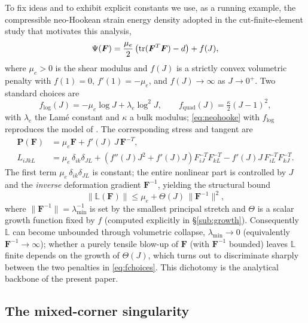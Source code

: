 To fix ideas and to exhibit explicit constants we use, as a running example, the compressible neo-Hookean strain energy
density adopted in the cut-finite-element study \cite{cutfemAD} that motivates this analysis,
\begin{equation}
    \label{eq:neohooke}
    \Psi(\bm{F}) = \frac{\mu_e}{2}\left( \operatorname{tr}(\bm{F}^T \bm{F}) - d \right) + f(J),
\end{equation}
where $\mu_e > 0$ is the shear modulus and $f(J)$ is a strictly convex volumetric penalty with $f(1) = 0$,
$f'(1) = -\mu_e$, and $f(J) \to \infty$ as $J \to 0^+$. Two standard choices are
\begin{equation}
    \label{eq:fchoices}
    f_{\log}(J) = -\mu_e \log J + \lambda_e \log^2 J,
    \qquad
    f_{\mathrm{quad}}(J) = \tfrac{\kappa}{2}(J-1)^2,
\end{equation}
with $\lambda_e$ the Lam\'e constant and $\kappa$ a bulk modulus; \eqref{eq:neohooke} with $f_{\log}$ reproduces the
model of \cite{cutfemAD}. The corresponding stress and tangent are
\begin{align}
    \bm{P}(\bm{F}) & = \mu_e \bm{F} + f'(J)\,J\,\bm{F}^{-T}, \\
    \label{eq:Lnh}
    L_{iJkL}       & = \mu_e\,\delta_{ik}\delta_{JL}
    + \left( f''(J)J^2 + f'(J)J \right) F^{-T}_{iJ} F^{-T}_{kL}
    - f'(J)J\, F^{-T}_{iL} F^{-T}_{kJ}.
\end{align}
The first term $\mu_e\,\delta_{ik}\delta_{JL}$ is constant; the entire nonlinear part is controlled by $J$ and the
\emph{inverse} deformation gradient $\bm{F}^{-1}$, yielding the structural bound
\begin{equation}
    \label{eq:Lbound}
    \| \mathbb{L}(\bm{F}) \| \le \mu_e + \Theta(J)\,\| \bm{F}^{-1} \|^2,
\end{equation}
where $\|\bm{F}^{-1}\| = \lambda_{\min}^{-1}$ is set by the smallest principal stretch and $\Theta$ is a scalar growth
function fixed by $f$ (computed explicitly in \S\ref{sub:growth}). Consequently $\mathbb{L}$ can become unbounded
through volumetric collapse, $\lambda_{\min} \to 0$ (equivalently $\bm{F}^{-1} \to \infty$); whether a purely tensile
blow-up of $\bm{F}$ (with $\bm{F}^{-1}$ bounded) leaves $\mathbb{L}$ finite depends on the growth of $\Theta(J)$, which
turns out to discriminate sharply between the two penalties in \eqref{eq:fchoices}. This dichotomy is the analytical
backbone of the present paper.

\subsection{The mixed-corner singularity}

